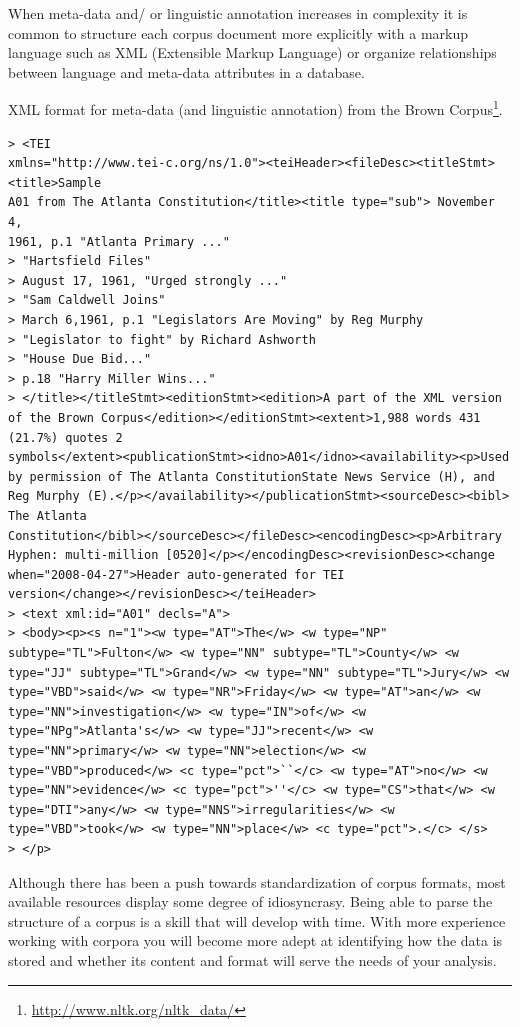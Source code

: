 \documentclass[
  letterpaper,
]{scrbook}
\DeclareRobustCommand{\href}[2]{#2\footnote{\url{#1}}}
\begin{document}
When meta-data and/ or linguistic annotation increases in complexity it
is common to structure each corpus document more explicitly with a
markup language such as XML (Extensible Markup Language) or organize
relationships between language and meta-data attributes in a database.

XML format for meta-data (and linguistic annotation) from the
\href{http://www.nltk.org/nltk_data/}{Brown Corpus}.

\begin{verbatim}
> <TEI
xmlns="http://www.tei-c.org/ns/1.0"><teiHeader><fileDesc><titleStmt><title>Sample
A01 from The Atlanta Constitution</title><title type="sub"> November 4,
1961, p.1 "Atlanta Primary ..."
> "Hartsfield Files"
> August 17, 1961, "Urged strongly ..."
> "Sam Caldwell Joins"
> March 6,1961, p.1 "Legislators Are Moving" by Reg Murphy
> "Legislator to fight" by Richard Ashworth
> "House Due Bid..."
> p.18 "Harry Miller Wins..."
> </title></titleStmt><editionStmt><edition>A part of the XML version
of the Brown Corpus</edition></editionStmt><extent>1,988 words 431
(21.7%) quotes 2
symbols</extent><publicationStmt><idno>A01</idno><availability><p>Used
by permission of The Atlanta ConstitutionState News Service (H), and
Reg Murphy (E).</p></availability></publicationStmt><sourceDesc><bibl>
The Atlanta
Constitution</bibl></sourceDesc></fileDesc><encodingDesc><p>Arbitrary
Hyphen: multi-million [0520]</p></encodingDesc><revisionDesc><change
when="2008-04-27">Header auto-generated for TEI
version</change></revisionDesc></teiHeader>
> <text xml:id="A01" decls="A">
> <body><p><s n="1"><w type="AT">The</w> <w type="NP"
subtype="TL">Fulton</w> <w type="NN" subtype="TL">County</w> <w
type="JJ" subtype="TL">Grand</w> <w type="NN" subtype="TL">Jury</w> <w
type="VBD">said</w> <w type="NR">Friday</w> <w type="AT">an</w> <w
type="NN">investigation</w> <w type="IN">of</w> <w
type="NPg">Atlanta's</w> <w type="JJ">recent</w> <w
type="NN">primary</w> <w type="NN">election</w> <w
type="VBD">produced</w> <c type="pct">``</c> <w type="AT">no</w> <w
type="NN">evidence</w> <c type="pct">''</c> <w type="CS">that</w> <w
type="DTI">any</w> <w type="NNS">irregularities</w> <w
type="VBD">took</w> <w type="NN">place</w> <c type="pct">.</c> </s>
> </p>
\end{verbatim}

Although there has been a push towards standardization of corpus
formats, most available resources display some degree of idiosyncrasy.
Being able to parse the structure of a corpus is a skill that will
develop with time. With more experience working with corpora you will
become more adept at identifying how the data is stored and whether its
content and format will serve the needs of your analysis.
\end{document}
